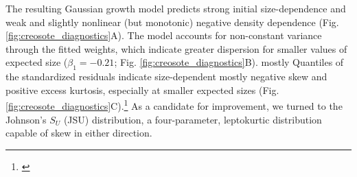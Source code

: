 \documentclass[12pt]{article}
\newcommand{\tom}[2]{{\color{red}{#1}}\footnote{\textit{\color{red}{#2}}}}
\begin{document}
The resulting Gaussian growth model predicts strong initial size-dependence and weak and slightly nonlinear (but monotonic) negative density dependence (Fig. \ref{fig:creosote_diagnostics}A). 
The model accounts for non-constant variance through the fitted weights, which indicate greater dispersion for smaller values of expected size ($\beta_{1}=-0.21$; Fig. \ref{fig:creosote_diagnostics}B). mostly 
Quantiles of the standardized residuals indicate size-dependent mostly negative skew and positive excess kurtosis, especially at smaller expected sizes (Fig. \ref{fig:creosote_diagnostics}C).\tom{}{Note that there is still a variance trend in the standardized residuals--rather unsatisfying! I have been through this backwards and forwards and my take is that this is a product of the sample size imbalance between small and large plants. The quantile regression is doing its best. SPE: I think a lot of it has to do with the fitted SD function. gam(family=``gaulss'') says
the standard deviation flattens out near the bottom, and using that SD function there is a smaller (but still unsatisfying) variance trend in the standardized residuals.} 
As a candidate for improvement, we turned to the Johnson's $S_{U}$ (JSU) distribution, a four-parameter, leptokurtic distribution capable of skew in either direction. 
\end{document}
